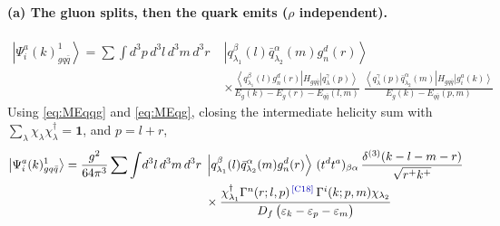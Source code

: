 \documentclass[11pt]{article}
\newcommand{\eps}{\varepsilon}
\newcommand{\dg}{\dagger}
\newcommand{\dthree}{\delta^{(3)}}
\newcommand{\ket}[1]{\left|#1\right\rangle}
\newcommand{\bra}[1]{\left\langle#1\right|}
\newcommand{\Gam}{\Gamma}
\newcommand{\qk}[3]{q^{#1}_{#2}(#3)}
\newcommand{\aqk}[3]{\bar q^{#1}_{#2}(#3)}
\newcommand{\gl}[3]{g^{#1}_{#2}(#3)}
\newcommand{\chg}[1]{{\color{blue!70!black}\textsuperscript{\,[C#1]}}}
\begin{document}
\paragraph{(a) The gluon splits, then the quark emits ($\rho$ independent).}
\begin{center}
\end{center}
\begin{align}
\ket{\Psi^{a}_{i}(k)^{1}_{gq\bar q}}=\sum\int\! d^{3}p\,d^{3}l\,d^{3}m\,d^{3}r\;
&\ket{\qk{\beta}{\lambda_{1}}{l}\aqk{\alpha}{\lambda_{2}}{m}\gl{d}{n}{r}}
\nonumber\\&\times
\frac{\bra{\qk{\beta}{\lambda_{1}}{l}\gl{d}{n}{r}}H_{gq\bar q}\ket{\qk{\gamma}{\lambda}{p}}}
{E_{g}(k)-E_{g}(r)-E_{q\bar q}(l,m)}\;
\frac{\bra{\qk{\gamma}{\lambda}{p}\aqk{\alpha}{\lambda_{2}}{m}}H_{gq\bar q}\ket{\gl{a}{i}{k}}}
{E_{g}(k)-E_{q\bar q}(p,m)}
\end{align}
Using \eqref{eq:MEqqg} and \eqref{eq:MEqg}, closing the intermediate helicity sum with
$\sum_{\lambda}\chi_{\lambda}\chi^{\dg}_{\lambda}=\mathbf{1}$, and $p=l+r$,
\begin{align}
\ket{\Psi^{a}_{i}(k)^{1}_{gq\bar q}}=\frac{g^{2}}{64\pi^{3}}\sum\int\! d^{3}l\,d^{3}m\,d^{3}r\;
&\ket{\qk{\beta}{\lambda_{1}}{l}\aqk{\alpha}{\lambda_{2}}{m}\gl{d}{n}{r}}\,
(t^{d}t^{a})_{\beta\alpha}\,\frac{\dthree(k-l-m-r)}{\sqrt{r^{+}k^{+}}}
\nonumber\\&\times
\frac{\chi^{\dg}_{\lambda_{1}}\Gam^{n}(r;l,p)\chg{18}\,\Gam^{i}(k;p,m)\chi_{\lambda_{2}}}
{D_{f}\,\big(\eps_{k}-\eps_{p}-\eps_{m}\big)}
\label{eq:B2a}
\end{align}
\end{document}
